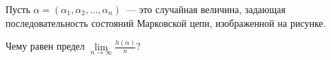 Пусть $\alpha = (\alpha_1, \alpha_2, \dots, \alpha_n)$~--- это случайная величина, задающая
последовательность состояний Марковской цепи, изображенной на рисунке.

Чему равен предел $\lim\limits_{n \to \infty} \frac{h(\alpha)}{n}$?